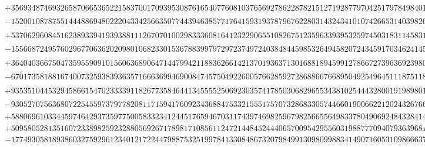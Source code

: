 \documentclass[preprint,12pt,authoryear]{elsarticle}
\begin{document}
{\begin{align*}
  &+356934874693265870665365221583700170939530876165407760810376569278622878215127192877970425179784984014582661641105x_5^9\\
  &-152001087875514448869480222043342566350774439463857717641593193787967622803143243410107426653140398261285409508742x_5^8\\
  &+53706296084516238933941939388111267070100298333608164123229065510826751235963393953259745031831145831662722511511x_5^7\\
  &-15566872495760296770636202098010682330153678839979729723749724038484459853264945820724345917034624145600833219006x_5^6\\
  &+3640403667504735955909101560636890647144799421188362661421370193637130168818945991278667273963692398047273666453x_5^5\\
  &-670173581881674007325938393635716663699469008474575049226005766285927286886676689504925496451118751189529451670x_5^4\\
  &+93535104453294586615470233339118267735846441345555250692303574178503068296553438102544432800191989801053615838x_5^3\\
  &-9305270756368072254559737977820811715941760923436884753321555175707328683305744660190066221202432676682105108x_5^2\\
  &+588069610334459746429373597750058332341244517659467031174397469825967982566556498337804906924843284145942504x_5\\
  &+5095805281351607233898259232880569267178981710856112472144845244406570095429556031988777094079363968x_2\\
  &-17749305818938603275929612340121722447988753251997841330848673207984991309809988341490716053109866637501340,
\end{align*}
}
\end{document}
